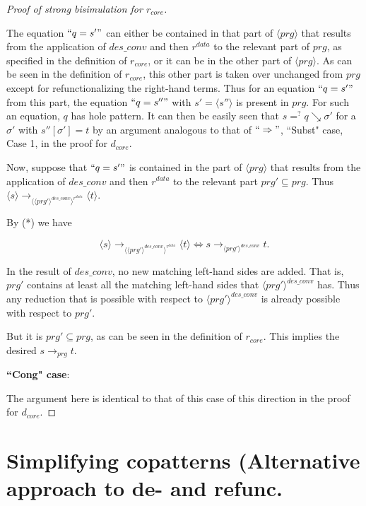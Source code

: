 \begin{proof}[Proof of strong bisimulation for $r_{core}$]
\begin{enumerate}
The equation $`` q = s' "$ can either be contained in that part of $\langle prg \rangle$ that results from the application of $des\_conv$ and then $r^{data}$ to the relevant part of $prg$, as specified in the definition of $r_{core}$, or it can be in the other part of $\langle prg \rangle$. As can be seen in the definition of $r_{core}$, this other part is taken over unchanged from $prg$ except for refunctionalizing the right-hand terms. Thus for an equation $`` q = s' "$ from this part, the equation $`` q = s'' "$ with $s' = \langle s'' \rangle$ is present in $prg$. For such an equation, $q$ has hole pattern. It can then be easily seen that $s =^? q \searrow \sigma'$ for a $\sigma'$ with $s''[\sigma'] = t$ by an argument analogous to that of $`` \Rightarrow "$, ``Subst" case, Case 1, in the proof for $d_{core}$.

Now, suppose that $`` q = s' "$ is contained in the part of $\langle prg \rangle$ that results from the application of $des\_conv$ and then $r^{data}$ to the relevant part $prg' \subseteq prg$. Thus $\langle s \rangle \longrightarrow_{\langle \langle prg' \rangle^{des\_conv} \rangle^{r^{data}}} \langle t \rangle$.

By (*) we have

\begin{equation*}
\langle s \rangle \longrightarrow_{\langle \langle prg' \rangle^{des\_conv} \rangle^{r^{data}}} \langle t \rangle \iff s \longrightarrow_{\langle prg' \rangle^{des\_conv}} t.
\end{equation*}

In the result of $des\_conv$, no new matching left-hand sides are added. That is, $prg'$ contains at least all the matching left-hand sides that $\langle prg' \rangle^{des\_conv}$ has. Thus any reduction that is possible with respect to $\langle prg' \rangle^{des\_conv}$ is already possible with respect to $prg'$.

But it is $prg' \subseteq prg$, as can be seen in the definition of $r_{core}$. This implies the desired $s \longrightarrow_{prg} t$.
\end{enumerate}

\item \textbf{``Cong" case}:

The argument here is identical to that of this case of this direction in the proof for $d_{core}$.

\end{proof}

\section{Simplifying copatterns (Alternative approach to de- and refunc.}

